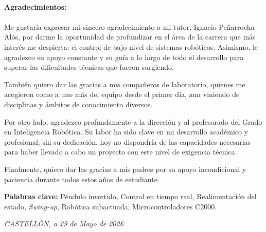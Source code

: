 \documentclass[11pt,fleqn]{book} %
\begin{document}

\newpage
~\vfill
\thispagestyle{empty}

\noindent \textbf{Agradecimientos:
\\
\\}Me gustaría expresar mi sincero agradecimiento a mi tutor, Ignacio Peñarrocha Alós, por darme la oportunidad de profundizar en el área de la carrera que más interés me despierta: el control de bajo nivel de sistemas robóticos. Asimismo, le agradezco su apoyo constante y su guía a lo largo de todo el desarrollo para superar las dificultades técnicas que fueron surgiendo.

También quiero dar las gracias a mis compañeros de laboratorio, quienes me acogieron como a uno más del equipo desde el primer día, aun viniendo de disciplinas y ámbitos de conocimiento diversos. 

Por otro lado, agradezco profundamente a la dirección y al profesorado del Grado en Inteligencia Robótica. Su labor ha sido clave en mi desarrollo académico y profesional; sin su dedicación, hoy no dispondría de las capacidades necesarias para haber llevado a cabo un proyecto con este nivel de exigencia técnica.

Finalmente, quiero dar las gracias a mis padres por su apoyo incondicional y paciencia durante todos estos años de estudiante. 

\vspace{1.2cm} 

\noindent \textbf{Palabras clave:} Péndulo invertido, Control en tiempo real, Realimentación del estado, \textit{Swing-up}, Robótica subactuada, Microcontroladores C2000.
\vspace{1.2cm}

\noindent \textit{CASTELLÓN, a 29 de Mayo de 2026} 


\usechapterimagefalse %

\end{document}
